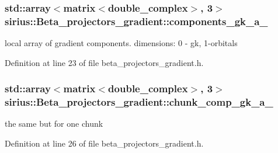 \subsubsection[{components\+\_\+gk\+\_\+a\+\_\+}]{\setlength{\rightskip}{0pt plus 5cm}std\+::array$<${\bf matrix}$<$double\+\_\+complex$>$, 3$>$ sirius\+::\+Beta\+\_\+projectors\+\_\+gradient\+::components\+\_\+gk\+\_\+a\+\_\+\hspace{0.3cm}{\ttfamily [protected]}}\label{classsirius_1_1_beta__projectors__gradient_a619e51c00341dee296a4490b46af4487}


local array of gradient components. dimensions\+: 0 -\/ gk, 1-\/orbitals 



Definition at line 23 of file beta\+\_\+projectors\+\_\+gradient.\+h.

\hypertarget{classsirius_1_1_beta__projectors__gradient_a6691530f9748af70ddac53d01250536a}{}
\subsubsection[{chunk\+\_\+comp\+\_\+gk\+\_\+a\+\_\+}]{\setlength{\rightskip}{0pt plus 5cm}std\+::array$<${\bf matrix}$<$double\+\_\+complex$>$, 3$>$ sirius\+::\+Beta\+\_\+projectors\+\_\+gradient\+::chunk\+\_\+comp\+\_\+gk\+\_\+a\+\_\+\hspace{0.3cm}{\ttfamily [protected]}}\label{classsirius_1_1_beta__projectors__gradient_a6691530f9748af70ddac53d01250536a}


the same but for one chunk 



Definition at line 26 of file beta\+\_\+projectors\+\_\+gradient.\+h.

\hypertarget{classsirius_1_1_beta__projectors__gradient_a08693b3d3b23dc8cae58f1a2f1d9b71d}{}
